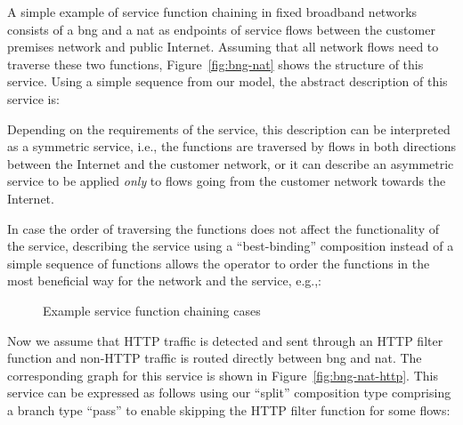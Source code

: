 \documentclass{sig-alternate-per}
\begin{document}
A simple example
of service function chaining in fixed broadband networks consists of a \ac{bng} and a 
\ac{nat} as endpoints of service flows between the customer premises network and public
Internet. Assuming that all network flows need to traverse these two functions, 
Figure~\ref{fig:bng-nat} shows the structure of this service. Using a simple 
sequence from our model, the abstract description of this service is:

{\scriptsize
\vspace{-8pt}

}

Depending on the requirements of the service, this description can be interpreted
as a symmetric service, i.e., the functions are traversed by flows in both directions
between the Internet and the customer network, or it can describe an asymmetric 
service to be applied \emph{only} to flows going from the customer network towards the 
Internet. 

In case the order of traversing the functions does not affect the functionality
of the service, describing the service using a ``best-binding'' composition instead
of a simple sequence of functions allows the operator to order the functions in 
the most beneficial way for the network and the service, e.g.,:

{\scriptsize
\vspace{-8pt}

}

\begin{figure}[!t]
\centering
{}
\vspace{-2pt}
\vspace{0pt}
\vspace{-2pt}

\caption{Example service function chaining cases}
\end{figure}

Now we assume that HTTP traffic is detected and sent through an HTTP filter function and 
non-HTTP traffic is routed directly between \ac{bng} and \ac{nat}. The corresponding
graph for this service is shown in Figure~\ref{fig:bng-nat-http}. This service 
can be expressed as follows using our ``split'' composition type comprising a branch type
``pass'' to enable skipping the HTTP filter function for some flows:
\end{document}
